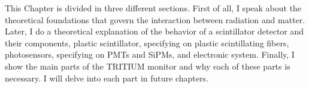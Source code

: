 This Chapter is divided in three different sections. First of all, I speak about the theoretical foundations that govern the interaction between radiation and matter. Later, I do a theoretical explanation of the behavior of a scintillator detector and their components, plastic scintillator, specifying on plastic scintillating fibers, photosensors, specifying on PMTs and SiPMs, and electronic system. Finally, I show the main parts of the TRITIUM monitor and why each of these parts is necessary. I will delve into each part in future chapters.